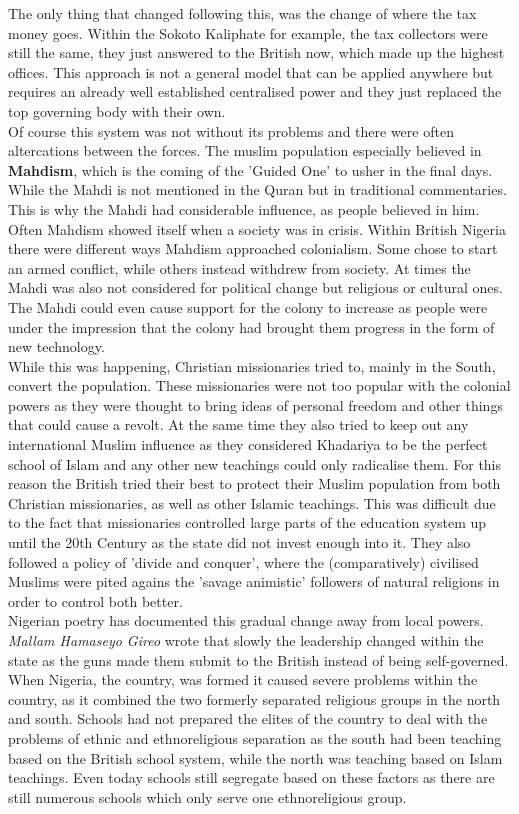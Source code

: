 \documentclass{article}
\begin{document}
	The only thing that changed following this, was the change of where the tax money goes. Within the Sokoto Kaliphate for example, the tax collectors were still the same, they just answered to the British now, which made up the highest offices. This approach is not a general model that can be applied anywhere but requires an already well established centralised power and they just replaced the top governing body with their own. \\
	Of course this system was not without its problems and there were often altercations between the forces. The muslim population especially believed in \textbf{Mahdism}, which is the coming of the 'Guided One' to usher in the final days. While the Mahdi is not mentioned in the Quran but in traditional commentaries. This is why the Mahdi had considerable influence, as people believed in him. Often Mahdism showed itself when a society was in crisis. Within British Nigeria there were different ways Mahdism approached colonialism. Some chose to start an armed conflict, while others instead withdrew from society. At times the Mahdi was also not considered for political change but religious or cultural ones. The Mahdi could even cause support for the colony to increase as people were under the impression that the colony had brought them progress in the form of new technology. \\
	While this was happening, Christian missionaries tried to, mainly in the South, convert the population. These missionaries were not too popular with the colonial powers as they were thought to bring ideas of personal freedom and other things that could cause a revolt. At the same time they also tried to keep out any international Muslim influence as they considered Khadariya to be the perfect school of Islam and any other new teachings could only radicalise them. For this reason the British tried their best to protect their Muslim population from both Christian missionaries, as well as other Islamic teachings. This was difficult due to the fact that missionaries controlled large parts of the education system up until the 20th Century as the state did not invest enough into it. They also followed a policy of 'divide and conquer', where the (comparatively) civilised Muslims were pited agains the 'savage animistic' followers of natural religions in order to control both better. \\
	Nigerian poetry has documented this gradual change away from local powers. \textit{Mallam Hamaseyo Gireo} wrote that slowly the leadership changed within the state as the guns made them submit to the British instead of being self-governed. \\
	When Nigeria, the country, was formed it caused severe problems within the country, as it combined the two formerly separated religious groups in the north and south. Schools had not prepared the elites of the country to deal with the problems of ethnic and ethnoreligious separation as the south had been teaching based on the British school system, while the north was teaching based on Islam teachings. Even today schools still segregate based on these factors as there are still numerous schools which only serve one ethnoreligious group.
\end{document}
